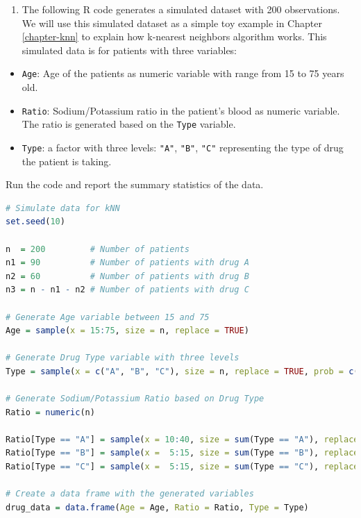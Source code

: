 \documentclass[
  11pt,
]{book}
\newcommand{\passthrough}[1]{#1}
\providecommand{\tightlist}{%
  \setlength{\itemsep}{0pt}\setlength{\parskip}{0pt}}
\theoremstyle{definition}
\theoremstyle{definition}
\theoremstyle{definition}
\theoremstyle{definition}
\theoremstyle{remark}
\begin{document}
\begin{enumerate}
\def\labelenumi{\arabic{enumi}.}
\setcounter{enumi}{16}
\tightlist
\item
  The following R code generates a simulated dataset with 200 observations. We will use this simulated dataset as a simple toy example in Chapter \ref{chapter-knn} to explain how k-nearest neighbors algorithm works. This simulated data is for patients with three variables:
\end{enumerate}

\begin{itemize}
\tightlist
\item
  \passthrough{\lstinline!Age!}: Age of the patients as numeric variable with range from 15 to 75 years old.\\
\item
  \passthrough{\lstinline!Ratio!}: Sodium/Potassium ratio in the patient's blood as numeric variable. The ratio is generated based on the \passthrough{\lstinline!Type!} variable.
\item
  \passthrough{\lstinline!Type!}: a factor with three levels: \passthrough{\lstinline!"A"!}, \passthrough{\lstinline!"B"!}, \passthrough{\lstinline!"C"!} representing the type of drug the patient is taking.
\end{itemize}

Run the code and report the summary statistics of the data.

\begin{lstlisting}[language=R]
# Simulate data for kNN
set.seed(10)

n  = 200         # Number of patients
n1 = 90          # Number of patients with drug A
n2 = 60          # Number of patients with drug B 
n3 = n - n1 - n2 # Number of patients with drug C

# Generate Age variable between 15 and 75
Age = sample(x = 15:75, size = n, replace = TRUE)

# Generate Drug Type variable with three levels
Type = sample(x = c("A", "B", "C"), size = n, replace = TRUE, prob = c(n1, n2, n3))

# Generate Sodium/Potassium Ratio based on Drug Type
Ratio = numeric(n)

Ratio[Type == "A"] = sample(x = 10:40, size = sum(Type == "A"), replace = TRUE)
Ratio[Type == "B"] = sample(x =  5:15, size = sum(Type == "B"), replace = TRUE)
Ratio[Type == "C"] = sample(x =  5:15, size = sum(Type == "C"), replace = TRUE)

# Create a data frame with the generated variables
drug_data = data.frame(Age = Age, Ratio = Ratio, Type = Type)
\end{lstlisting}
\end{document}
